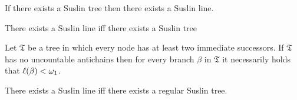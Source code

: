 \begin{lem}
	If there exists a Suslin tree then there exists a Suslin line.
\end{lem}

\begin{thm}
	There exists a Suslin line iff there exists a Suslin tree
\end{thm}

\begin{prp}
	Let $\mathfrak{T}$ be a tree in which every node has at least two immediate successors.  If $\mathfrak{T}$ has no uncountable antichains then for every branch $\beta$ in $\mathfrak{T}$ it necessarily holds that $\ell(\beta)<\omega_1$.
\end{prp}

\begin{thm}
	There exists a Suslin line iff there exists a regular Suslin tree.
\end{thm}
